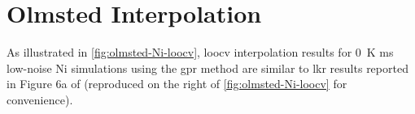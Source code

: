 \documentclass[preprint,12pt]{elsarticle}
\begin{document}

\section{Olmsted Interpolation}

As illustrated in \cref{fig:olmsted-Ni-loocv}, \gls{loocv} interpolation results for \SI{0}{\kelvin} \gls{ms} low-noise Ni simulations using the \gls{gpr} method are similar to \gls{lkr} results reported in Figure 6a of \citet{chesserLearningGrainBoundary2020} (reproduced on the right of \cref{fig:olmsted-Ni-loocv} for convenience).
\end{document}
